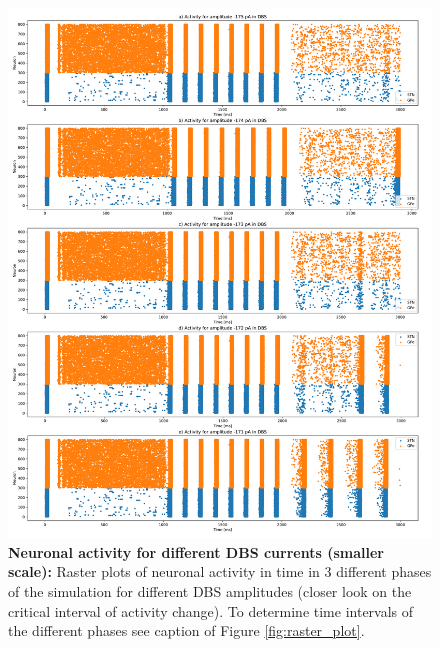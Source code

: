 \documentclass[11pt]{article}
\begin{document}
\begin{figure}[tb]
    \centering
    \includegraphics[width=\textwidth]{images/different_dbs_amplitudes_specific.pdf}
    \caption{\textbf{Neuronal activity for different DBS currents (smaller scale):} 
    Raster plots of neuronal activity in time in 3 different phases of 
    the simulation for different DBS amplitudes
    (closer look on the critical interval of activity change).
    To determine time intervals of the different phases see caption of Figure
    \ref{fig:raster_plot}.}
    \label{fig:different_DBS_specific}
\end{figure}
\end{document}
